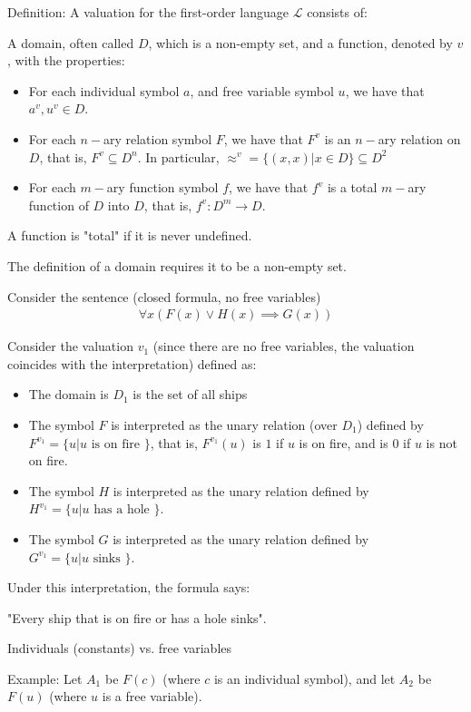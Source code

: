 \documentclass{article}
\begin{document}
Definition: A valuation for the first-order language $\mathcal{L}$ consists of:

A domain, often called $D$, which is a non-empty set, and a function, denoted by $v$, with the properties:
\begin{itemize}
\item For each individual symbol $a$, and free variable symbol $u$, we have that $a^v, u^v \in D$.
\item For each $n-$ary relation symbol $F$, we have that $F^v$ is an $n-$ary relation on $D$, that is, $F^v \subseteq D^n$. In particular, $\approx^v = \{(x,x) | x \in D\} \subseteq D^2$
\item For each $m-$ary function symbol $f$, we have that $f^v$ is a total $m-$ary function of $D$ into $D$, that is, $f^v: D^m \longrightarrow D$.
\end{itemize}

A function is "total" if it is never undefined.

The definition of a domain requires it to be a non-empty set.

Consider the sentence (closed formula, no free variables)
\begin{align*}
\forall x (F(x) \vee H(x) \implies G(x))
\end{align*}

Consider the valuation $v_1$ (since there are no free variables, the valuation coincides with the interpretation) defined as:
\begin{itemize}
    \item The domain is $D_1$ is the set of all ships
    \item The symbol $F$ is interpreted as the unary relation (over $D_1$) defined by $F^{v_1} = \{u | u \text{ is on fire } \}$, that is, $F^{v_1}(u)$ is $1$ if $u$ is on fire, and is $0$ if $u$ is not on fire.
    \item The symbol $H$ is interpreted as the unary relation defined by $H^{v_1} = \{u | u \text{ has a hole } \}$.
    \item The symbol $G$ is interpreted as the unary relation defined by $G^{v_1} = \{u | u \text{ sinks } \}$.
\end{itemize}

Under this interpretation, the formula says:

"Every ship that is on fire or has a hole sinks".


Individuals (constants) vs. free variables

Example: Let $A_1$ be $F(c)$ (where $c$ is an individual symbol), and let $A_2$ be $F(u)$ (where $u$ is a free variable). 
\end{document}

